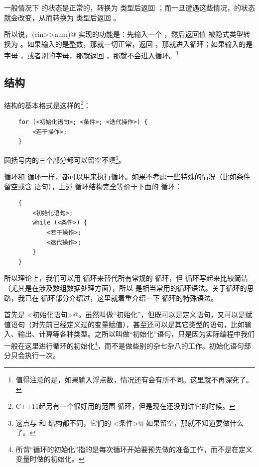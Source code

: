 一般情况下 \lstinline@cin@ 的状态是正常的，转换为 \lstinline@bool@ 类型后返回 \lstinline@true@；而一旦遭遇这些情况，\lstinline@cin@ 的状态就会改变，从而转换为 \lstinline@bool@ 类型后返回 \lstinline@false@。\par
所以说，\lstinline@while(cin>>num)@ 实现的功能是：先输入一个 \lstinline@num@，然后返回值 \lstinline@cin@ 被隐式类型转换为 \lstinline@bool@。如果输入的是整数，那就一切正常，返回 \lstinline@true@，那就进入循环；如果输入的是字母 \lstinline@q@ ，或者别的字母，那就返回 \lstinline@false@，那就不会进入循环。\footnote{值得注意的是，如果输入浮点数，情况还有会有所不同。这里就不再深究了。}\par
\subsection*{\lstinline@for@ 结构}
\lstinline@for@ 结构的基本格式是这样的\footnote{C++11起另有一个很好用的范围 \lstinline@for@ 循环，但是现在还没到讲它的时候。}：
\begin{lstlisting}
    for (<初始化语句>; <条件>; <迭代操作>) {
        <若干操作>;
    }
\end{lstlisting}
\lstinline@for@ 圆括号内的三个部分都可以留空不填\footnote{这点与 \lstinline@if@ 和 \lstinline@while@ 结构都不同，它们的 \lstinline@<条件>@ 如果留空，那就不知道要做什么了。}。\par
\lstinline@for@ 循环和 \lstinline@while@ 循环一样，都可以用来执行循环。如果不考虑一些特殊的情况（比如条件留空或含 \lstinline@continue@ 语句），上述 \lstinline@for@ 循环结构完全等价于下面的 \lstinline@while@ 循环：
\begin{lstlisting}
    {
        <初始化语句>;
        while (<条件>) {
            <若干操作>;
            <迭代操作>;
        }
    }
\end{lstlisting}\par
所以理论上，我们可以用 \lstinline@while@ 循环来替代所有常规的 \lstinline@for@ 循环，但 \lstinline@for@ 循环写起来比较简洁（尤其是在涉及数组数据处理方面），所以 \lstinline@for@ 是相当常用的循环语法。关于循环的思路，我已在 \lstinline@while@ 循环部分介绍过，这里就着重介绍一下 \lstinline@for@ 循环的特殊语法。\par
首先是 \lstinline@<初始化语句>@。虽然叫做``初始化''，但既可以是定义语句，又可以是赋值语句（对先前已经定义过的变量赋值），甚至还可以是其它类型的语句，比如输入、输出、计算等各种类型。之所以叫做``初始化''语句，只是因为实际编程中我们一般在这里进行循环的初始化\footnote{所谓``循环的初始化''指的是每次循环开始要预先做的准备工作，而不是在定义变量时做的初始化。}，而不是做些别的杂七杂八的工作。初始化语句部分只会执行一次。\par
